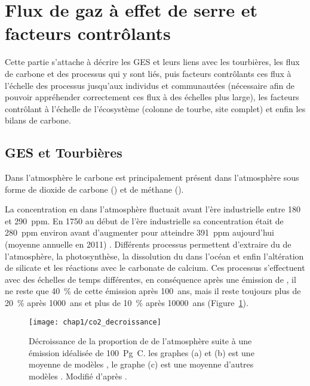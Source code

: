 
\section{Flux de gaz à effet de serre et facteurs contrôlants}

Cette partie s'attache à décrire les GES et leurs liens avec les tourbières, les flux de carbone et des processus qui y sont liés, puis facteurs contrôlants ces flux à l'échelle des processus jusqu'aux individus et communautées (nécessaire afin de pouvoir appréhender correctement ces flux à des échelles plus large), les facteurs contrôlant à l'échelle de l'écosystème (colonne de tourbe, site complet) et enfin les bilans de carbone.


\subsection{GES et Tourbières}

Dans l'atmosphère le carbone est principalement présent dans l'atmosphère sous forme de dioxide de carbone (\coo) et de méthane (\chh).

La concentration en \coo dans l'atmosphère fluctuait avant l'ère industrielle entre 180 et \SI{290}{ppm}.
En 1750 au début de l'ère industrielle sa concentration était de \SI{280}{ppm} environ avant d'augmenter pour atteindre \SI{391}{ppm} aujourd'hui (moyenne annuelle en 2011) \citep{Ciais2014}.
Différents processus permettent d'extraire du \coo de l'atmosphère, la photosynthèse, la dissolution du \coo dans l'océan et enfin l'altération de silicate et les réactions avec le carbonate de calcium.
Ces processus s'effectuent avec des échelles de temps différentes, en conséquence après une émission de \coo, il ne reste que \SI{40}{\percent} de cette émission après \SI{100}{ans}, mais il reste toujours plus de \SI{20}{\percent} après \SI{1000}{ans} et plus de \SI{10}{\percent} après \SI{10000}{ans} \citep{joos2013,Ciais2014} (Figure~\ref{fig:co2_decroissance}).

\begin{figure}
\centering
\texttt{[image: chap1/co2\_decroissance]}
\caption{Décroissance de la proportion de \coo de l'atmosphère suite à une émission idéalisée de \SI{100}{\peta\gram C}. les graphes (a) et (b) est une moyenne de modèles \citep{joos2013}, le graphe (c) est une moyenne d'autres modèles \citep{archer2009}. Modifié d'après \citep{Ciais2014}.}
\label{fig:co2_decroissance}
\end{figure}



